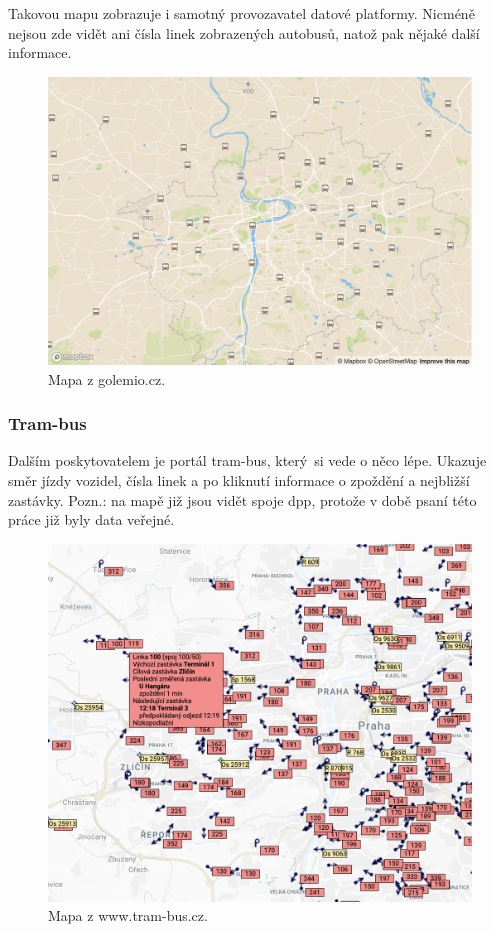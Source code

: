 Takovou mapu zobrazuje i samotný provozavatel datové platformy. Nicméně nejsou zde vidět ani čísla linek zobrazených autobusů, natož pak nějaké další informace.

\begin{figure}
  \includegraphics[width=\linewidth]{../img/golemio_mapa.png}
  \caption{Mapa z golemio.cz.}
  \label{fig:golemio_result}
\end{figure}

\subsubsection{Tram-bus}

Dalším poskytovatelem je portál tram-bus, který si vede o něco lépe. Ukazuje směr jízdy vozidel, čísla linek a po kliknutí informace o zpoždění a nejbližší zastávky. Pozn.: na mapě již jsou vidět spoje \gls{dpp}, protože v době psaní této práce již byly data veřejné.

\begin{figure}
  \includegraphics[width=\linewidth]{../img/tram-bus_mapa.png}
  \caption{Mapa z www.tram-bus.cz.}
  \label{fig:tram-bus_result}
\end{figure}

